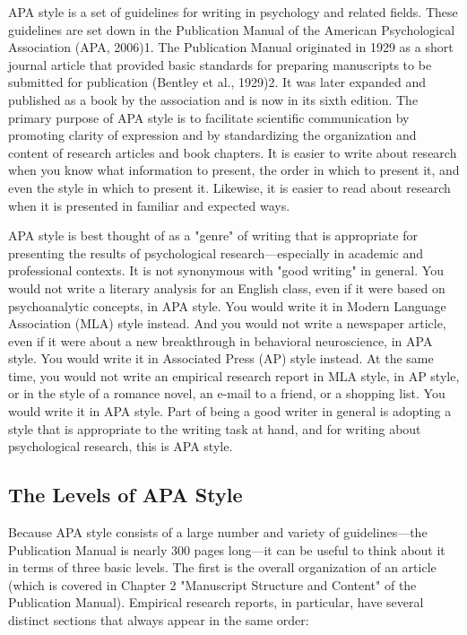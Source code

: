 APA style is a set of guidelines for writing in psychology and related fields. These guidelines are set down in the Publication Manual of the American Psychological Association (APA, 2006)1. The Publication Manual originated in 1929 as a short journal article that provided basic standards for preparing manuscripts to be submitted for publication (Bentley et al., 1929)2. It was later expanded and published as a book by the association and is now in its sixth edition. The primary purpose of APA style is to facilitate scientific communication by promoting clarity of expression and by standardizing the organization and content of research articles and book chapters. It is easier to write about research when you know what information to present, the order in which to present it, and even the style in which to present it. Likewise, it is easier to read about research when it is presented in familiar and expected ways.




APA style is best thought of as a "genre" of writing that is appropriate for presenting the results of psychological research---especially in academic and professional contexts. It is not synonymous with "good writing" in general. You would not write a literary analysis for an English class, even if it were based on psychoanalytic concepts, in APA style. You would write it in Modern Language Association (MLA) style instead. And you would not write a newspaper article, even if it were about a new breakthrough in behavioral neuroscience, in APA style. You would write it in Associated Press (AP) style instead. At the same time, you would not write an empirical research report in MLA style, in AP style, or in the style of a romance novel, an e-mail to a friend, or a shopping list. You would write it in APA style. Part of being a good writer in general is adopting a style that is appropriate to the writing task at hand, and for writing about psychological research, this is APA style.




\subsection{The Levels of APA Style}


Because APA style consists of a large number and variety of guidelines---the Publication Manual is nearly 300 pages long---it can be useful to think about it in terms of three basic levels. The first is the overall organization of an article (which is covered in Chapter 2 "Manuscript Structure and Content" of the Publication Manual). Empirical research reports, in particular, have several distinct sections that always appear in the same order:


